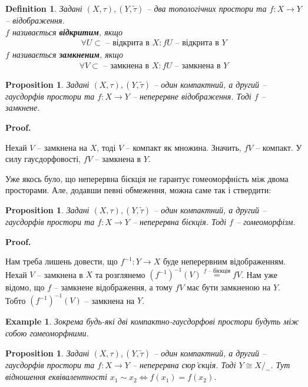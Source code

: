 \documentclass[a4paper, 10pt]{article}
\makeatletter
\theoremstyle{theoremdd}
\newtheorem{definition}[theorem]{Definition}
\newtheorem{example}[theorem]{Example}
\newtheorem{proposition}[theorem]{Proposition}
\renewenvironment{proof}[1][Proof.\\]{\par
\pushQED{\hfill \qed}%
\normalfont \topsep6\p@\@plus6\p@\relax
\trivlist
\item\relax
{\bfseries
#1\@addpunct{.}}\hspace\labelsep\ignorespaces
}{%
\popQED\endtrivlist\@endpefalse
}
\makeatother
\begin{document}
\begin{definition}
Задані $(X,\tau),(Y,\tilde{\tau})$ -- два топологічних простори та $f \colon X \to Y$ -- відображення.\\
$f$ називається \textbf{відкритим}, якщо
\begin{align*}
\forall U \subset \text{ -- відкрита в } X: fU \text{ -- відкрита в } Y
\end{align*}
$f$ називається \textbf{замкненим}, якщо
\begin{align*}
\forall V \subset \text{ -- замкнена в } X: fU \text{ -- замкнена в } Y
\end{align*}
\end{definition}

\begin{proposition}
Задані $(X,\tau),(Y,\tilde{\tau})$ -- один компактний, а другий -- гаусдорфів простори та $f \colon X \to Y$ -- неперервне відображення. Тоді $f$ -- замкнене.
\end{proposition}

\begin{proof}
Нехай $V$ -- замкнена на $X$, тоді $V$ -- компакт як множина. Значить, $fV$ -- компакт. У силу гаусдорфовості, $fV$ -- замкнена в $Y$.
\end{proof}

\noindent Уже якось було, що неперервна бієкція не гарантує гомеоморфність між двома просторами. Але, додавши певні обмеження, можна саме так і ствердити:

\begin{proposition}
Задані $(X,\tau),(Y,\tilde{\tau})$ -- один компактний, а другий -- гаусдорфів простори та $f \colon X \to Y$ -- неперервна бієкція. Тоді $f$ -- гомеоморфізм.
\end{proposition}

\begin{proof}
Нам треба лишень довести, що $f^{-1} \colon Y \to X$ буде неперервним відображенням.\\
Нехай $V$ -- замкнена в $X$ та розглянемо $(f^{-1})^{-1}(V) \overset{f \text{ -- бієкція}}{=} fV$. Нам уже відомо, що $f$ -- замкнене відображення, а тому $fV$ має бути замкненою на $Y$. Тобто $(f^{-1})^{-1}(V)$ -- замкнена на $Y$.
\end{proof}

\begin{example}
Зокрема будь-які дві компактно-гаусдорфові простори будуть між собою гомеоморфними.
\end{example}

\begin{proposition}
Задані $(X,\tau),(Y,\tilde{\tau})$ -- один компактний, а другий -- гаусдорфів простори та $f \colon X \to Y$ -- неперервна сюр'єкція. Тоді $Y \cong X/_\sim$. Тут відношення еквівалентності $x_1 \sim x_2 \iff f(x_1) = f(x_2)$.
\end{proposition}
\end{document}
